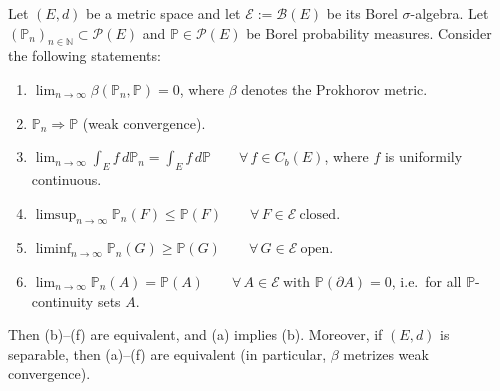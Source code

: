 \begin{theorem}\label{thm:portmanteau-prokhorov}
Let $(E,d)$ be a metric space and let $\mathcal{E}:=\mathcal{B}(E)$ be its Borel $\sigma$-algebra.
Let $(\mathbb{P}_n)_{n\in\mathbb{N}}\subset \mathcal{P}(E)$ and $\mathbb{P}\in\mathcal{P}(E)$ be Borel probability measures.
Consider the following statements:
\begin{enumerate}[label=\textnormal{(\alph*)}, leftmargin=3.2em]
  \item $\displaystyle \lim_{n\to\infty}\beta(\mathbb{P}_n,\mathbb{P})=0$, where $\beta$ denotes the Prokhorov metric.
  \item $\mathbb{P}_n \Rightarrow \mathbb{P}$ (weak convergence).
  \item $\displaystyle \lim_{n\to\infty}\int_E f\,d\mathbb{P}_n=\int_E f\,d\mathbb{P}\qquad \forall\, f\in C_b(E)$,
        where $f$ is uniformily continuous.
  \item $\displaystyle \limsup_{n\to\infty}\mathbb{P}_n(F)\le \mathbb{P}(F)\qquad \forall\, F\in\mathcal{E}\ \text{closed}$.
  \item $\displaystyle \liminf_{n\to\infty}\mathbb{P}_n(G)\ge \mathbb{P}(G)\qquad \forall\, G\in\mathcal{E}\ \text{open}$.
  \item $\displaystyle \lim_{n\to\infty}\mathbb{P}_n(A)=\mathbb{P}(A)\qquad \forall\, A\in\mathcal{E}\ \text{with }\mathbb{P}(\partial A)=0$,
        i.e.\ for all $\mathbb{P}$-continuity sets $A$.
\end{enumerate}
Then \textnormal{(b)}--\textnormal{(f)} are equivalent, and \textnormal{(a)} implies \textnormal{(b)}.
Moreover, if $(E,d)$ is separable, then \textnormal{(a)}--\textnormal{(f)} are equivalent (in particular, $\beta$ metrizes weak convergence).
\end{theorem}

